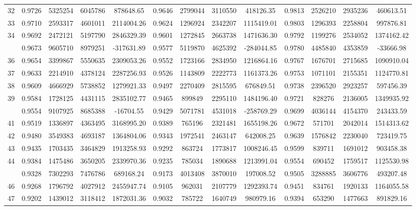 \documentclass[
  12pt,
]{article}
\begin{document}
\begin{longtable}[t]{lcccccccccccc}
32 & 0.9726 & 5325254 & 6045786 & 878648.65 & 0.9646 & 2799044 & 3110550 & 418126.35 & 0.9813 & 2526210 & 2935236 & 460613.51\\
33 & 0.9710 & 2593317 & 4601011 & 2114004.26 & 0.9624 & 1296924 & 2342207 & 1115419.01 & 0.9803 & 1296393 & 2258804 & 997876.81\\
34 & 0.9692 & 2472121 & 5197790 & 2846329.39 & 0.9601 & 1272845 & 2663738 & 1471636.30 & 0.9792 & 1199276 & 2534052 & 1374162.42\\
\addlinespace
35 & 0.9673 & 9605710 & 8979251 & -317631.89 & 0.9577 & 5119870 & 4625392 & -284044.85 & 0.9780 & 4485840 & 4353859 & -33666.98\\
36 & 0.9654 & 3399867 & 5550635 & 2309053.26 & 0.9552 & 1723166 & 2834950 & 1216864.16 & 0.9767 & 1676701 & 2715685 & 1090910.04\\
37 & 0.9633 & 2214910 & 4378124 & 2287256.93 & 0.9526 & 1143809 & 2222773 & 1161373.26 & 0.9753 & 1071101 & 2155351 & 1124770.81\\
38 & 0.9609 & 4666929 & 5738852 & 1279921.33 & 0.9497 & 2270409 & 2815595 & 676849.51 & 0.9738 & 2396520 & 2923257 & 597456.39\\
39 & 0.9584 & 1728125 & 4431115 & 2835102.77 & 0.9465 & 899849 & 2295110 & 1484196.40 & 0.9721 & 828276 & 2136005 & 1349935.92\\
\addlinespace
40 & 0.9554 & 9107925 & 8685388 & -16704.55 & 0.9429 & 5071781 & 4531018 & -258769.29 & 0.9699 & 4036144 & 4154370 & 243433.59\\
41 & 0.9519 & 1336897 & 4363495 & 3168995.20 & 0.9389 & 765196 & 2321481 & 1655198.26 & 0.9672 & 571701 & 2042014 & 1514313.62\\
42 & 0.9480 & 3549383 & 4693187 & 1364804.06 & 0.9343 & 1972541 & 2463147 & 642008.25 & 0.9639 & 1576842 & 2230040 & 723419.75\\
43 & 0.9435 & 1703435 & 3464829 & 1913258.93 & 0.9292 & 863724 & 1773817 & 1008246.45 & 0.9599 & 839711 & 1691012 & 903458.38\\
44 & 0.9384 & 1475486 & 3650205 & 2339970.36 & 0.9235 & 785034 & 1890688 & 1213991.04 & 0.9554 & 690452 & 1759517 & 1125530.98\\
\addlinespace
45 & 0.9328 & 7302293 & 7476786 & 689168.24 & 0.9173 & 4013408 & 3870010 & 197008.52 & 0.9505 & 3288885 & 3606776 & 493207.48\\
46 & 0.9268 & 1796792 & 4027912 & 2455947.74 & 0.9105 & 962031 & 2107779 & 1292393.74 & 0.9451 & 834761 & 1920133 & 1164055.58\\
47 & 0.9202 & 1439012 & 3118412 & 1872031.36 & 0.9032 & 785722 & 1640749 & 980979.16 & 0.9394 & 653290 & 1477663 & 891829.16\\

\end{longtable}
\end{document}
